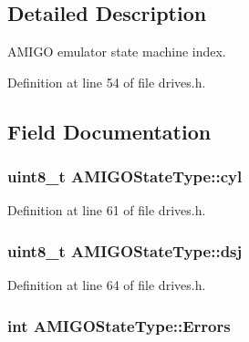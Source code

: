 \subsection{Detailed Description}
A\+M\+I\+GO emulator state machine index. 

Definition at line 54 of file drives.\+h.



\subsection{Field Documentation}
\subsubsection[{\texorpdfstring{cyl}{cyl}}]{\setlength{\rightskip}{0pt plus 5cm}uint8\+\_\+t A\+M\+I\+G\+O\+State\+Type\+::cyl}\hypertarget{structAMIGOStateType_a54b4a4f8221f9d38fb93f2d23a40e305}{}\label{structAMIGOStateType_a54b4a4f8221f9d38fb93f2d23a40e305}


Definition at line 61 of file drives.\+h.

\subsubsection[{\texorpdfstring{dsj}{dsj}}]{\setlength{\rightskip}{0pt plus 5cm}uint8\+\_\+t A\+M\+I\+G\+O\+State\+Type\+::dsj}\hypertarget{structAMIGOStateType_ab2294deecb44cdb1675e4096dba22eb1}{}\label{structAMIGOStateType_ab2294deecb44cdb1675e4096dba22eb1}


Definition at line 64 of file drives.\+h.

\subsubsection[{\texorpdfstring{Errors}{Errors}}]{\setlength{\rightskip}{0pt plus 5cm}int A\+M\+I\+G\+O\+State\+Type\+::\+Errors}\hypertarget{structAMIGOStateType_ad04b5b3ffd8fabff547e6498d534feac}{}\label{structAMIGOStateType_ad04b5b3ffd8fabff547e6498d534feac}


